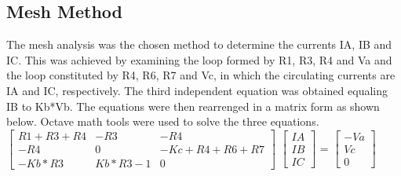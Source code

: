 \subsection{Mesh Method}

The mesh analysis was the chosen method to determine the currents IA, IB and IC. This was achieved by examining the loop formed by R1, R3, R4 and Va and the loop constituted by R4, R6, R7 and Vc, in which the circulating currents are IA and IC, respectively. The third independent equation was obtained equaling IB to Kb*Vb. The equations were then rearrenged in a matrix form as shown below. Octave math tools were used to solve the three equations.\\

$\begin{bmatrix}
R1+R3+R4 & -R3 & -R4\\
   
-R4 & 0 & -Kc+R4+R6+R7\\

-Kb*R3 & Kb*R3-1 & 0
\end{bmatrix}$
$\begin{bmatrix}
IA\\
IB\\
IC
\end{bmatrix}$
= 
$\begin{bmatrix}
-Va\\
Vc\\
0
\end{bmatrix}$





